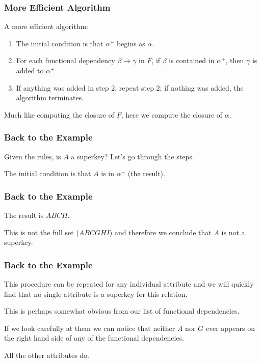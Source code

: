 \begin{frame}
\frametitle{More Efficient Algorithm}

A more efficient algorithm:

\begin{enumerate}
	\item The initial condition is that $\alpha^{+}$ begins as $\alpha$.
	\item For each functional dependency $\beta \rightarrow \gamma$ in $F$,
		if $\beta$ is contained in $\alpha^{+}$, then $\gamma$ is added to $\alpha^{+}$
	\item If anything was added in step 2, repeat step 2; if nothing was added, the algorithm terminates.
\end{enumerate}

Much like computing the closure of $F$, here we compute the closure of $\alpha$. 

\end{frame}



\begin{frame}
\frametitle{Back to the Example}

Given the rules, is $A$ a superkey? Let's go through the steps. 

The initial condition is that $A$ is in $\alpha^{+}$ (the result). 

\end{frame}



\begin{frame}
\frametitle{Back to the Example}

The result is $ABCH$. 

This is not the full set ($ABCGHI$) and therefore we conclude that $A$ is not a superkey.

\end{frame}



\begin{frame}
\frametitle{Back to the Example}

This procedure can be repeated for any individual attribute and we will quickly find that no single attribute is a superkey for this relation. 

This is perhaps somewhat obvious from our list of functional dependencies. 

If we look carefully at them we can notice that neither $A$ nor $G$ ever appears on the right hand side of any of the functional dependencies.

All the other attributes do.


\end{frame}



